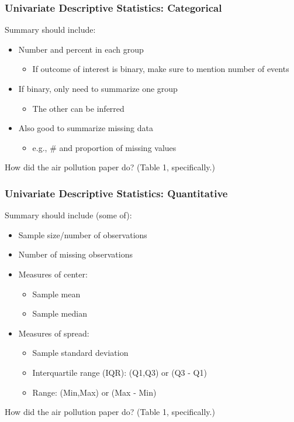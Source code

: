 \documentclass[12pt, 
hyperref={colorlinks=true, linkcolor=blue, urlcolor=cyan}]{beamer}
\begin{document}
\begin{frame}
\frametitle{Univariate Descriptive Statistics: Categorical}

Summary should include:
\begin{itemize}
\item Number and percent in each group
	\begin{itemize}
	\item If outcome of interest is binary, make sure to mention number of events
	\end{itemize}
\item If binary, only need to summarize one group
	\begin{itemize}
	\item The other can be inferred
	\end{itemize}
\item Also good to summarize missing data
	\begin{itemize}
	\item e.g., \#  and proportion of missing values
	\end{itemize}
\end{itemize}

How did the air pollution paper do? (Table 1, specifically.) %

\end{frame}

\begin{frame}
\frametitle{Univariate Descriptive Statistics: Quantitative}

Summary should include (some of):
\begin{itemize}
\item Sample size/number of observations
\item Number of missing observations
\item Measures of center: 
	\begin{itemize}
	\item Sample mean
	\item Sample median
	\end{itemize}
\item Measures of spread:
	\begin{itemize}
	\item Sample standard deviation
	\item Interquartile range (IQR): (Q1,Q3) or (Q3 - Q1)
	\item Range: (Min,Max) or (Max - Min)
	\end{itemize}
\end{itemize}
How did the air pollution paper do? (Table 1, specifically.) %
\end{frame}
\end{document}
